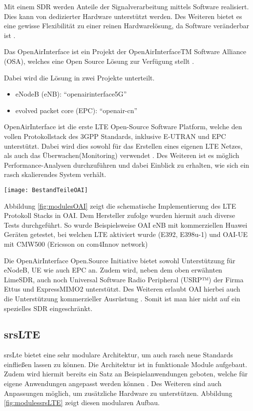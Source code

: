Mit einem SDR werden Anteile der Signalverarbeitung mittels Software realisiert. Dies kann von dedizierter Hardware unterstützt werden. Des Weiteren bietet es eine gewisse Flexibilität zu einer reinen Hardwarelösung, da Software veränderbar ist \cite{jondral2005software}. 

Das OpenAirInterface ist ein Projekt der OpenAirInterfaceTM Software Alliance (OSA), welches eine Open Source Lösung zur Verfügung stellt \cite{OpenAir19}.

Dabei wird die Lösung in zwei Projekte unterteilt. 
\begin{itemize}
	\item eNodeB (eNB): “openairinterface5G”
	\item evolved packet core (EPC): “openair-cn”
\end{itemize}

OpenAirInterface ist die erste LTE Open-Source Software Platform, welche den vollen Protokollstack des 3GPP Standards, inklusive E-UTRAN und EPC unterstützt.
Dabei wird dies sowohl für das Erstellen eines eigenen LTE Netzes, als auch das Überwachen(Monitoring) verwendet \cite{nikaein2014openairinterface}.
Des Weiteren ist es möglich Performance-Analysen durchzuführen und dabei Einblick zu erhalten, wie sich ein rasch skalierendes System verhält. 

\begin{figure*}[ht]
	\centering
	\texttt{[image: BestandTeileOAI]}
	\caption{Übersicht LTE Module in den jeweiligen Projekten \protect\cite{openAirInterfaceOverview19}}
	\label{fig:modulesOAI}
\end{figure*}


Abbildung \ref{fig:modulesOAI} zeigt die schematische Implementierung des LTE Protokoll Stacks in OAI.
Dem Hersteller zufolge wurden hiermit auch diverse Tests durchgeführt. So wurde Beispielsweise OAI eNB mit kommerziellen Huawei Geräten getestet, bei welchen LTE aktiviert wurde (E392, E398u-1) und OAI-UE mit CMW500 (Ericsson on com4Innov network)

Die OpenAirInterface Open.Source Initiative bietet sowohl Unterstützung für eNodeB, UE wie auch EPC an. Zudem wird, neben dem oben erwähnten LimeSDR, auch noch Universal Software Radio Peripheral (USRP™) der Firma Ettus und ExpressMIMO2 unterstützt. Des Weiteren erlaubt OAI hierbei auch die Unterstützung kommerzieller Ausrüstung \cite{kaltenberger2019openairinterface}. Somit ist man hier nicht auf ein spezielles SDR eingeschränkt.

\subsection{srsLTE}
srsLte bietet eine sehr modulare Architektur, um auch rasch neue Standards einfließen lassen zu können. Die Architektur ist in funktionale Module aufgebaut. Zudem wird hiermit bereits ein Satz an Beispielanwendungen geboten, welche für eigene Anwendungen angepasst werden können \cite{puschmann2017implementing}. 
Des Weiteren sind auch Anpassungen möglich, um zusätzliche Hardware zu unterstützen. 
Abbildung \ref{fig:modulessrsLTE} zeigt diesen modularen Aufbau.

